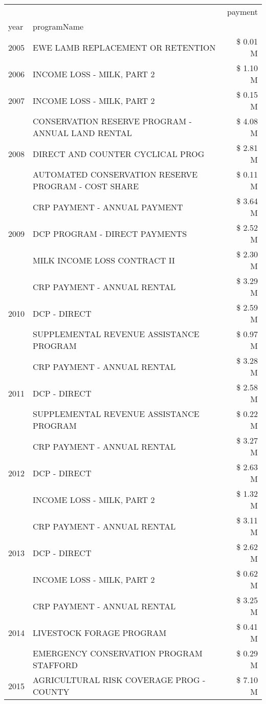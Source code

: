 \begin{tabular}{llr}
\toprule
 &  & payment \\
year & programName &  \\
\midrule
2005 & EWE LAMB REPLACEMENT OR RETENTION & \$ 0.01 M \\
\cline{1-3}
2006 & INCOME LOSS - MILK, PART 2 & \$ 1.10 M \\
\cline{1-3}
2007 & INCOME LOSS - MILK, PART 2 & \$ 0.15 M \\
\cline{1-3}
\multirow[t]{3}{*}{2008} & CONSERVATION RESERVE PROGRAM - ANNUAL LAND RENTAL & \$ 4.08 M \\
 & DIRECT AND COUNTER CYCLICAL PROG & \$ 2.81 M \\
 & AUTOMATED CONSERVATION RESERVE PROGRAM - COST SHARE & \$ 0.11 M \\
\cline{1-3}
\multirow[t]{3}{*}{2009} & CRP PAYMENT - ANNUAL PAYMENT & \$ 3.64 M \\
 & DCP PROGRAM - DIRECT PAYMENTS & \$ 2.52 M \\
 & MILK INCOME LOSS CONTRACT II & \$ 2.30 M \\
\cline{1-3}
\multirow[t]{3}{*}{2010} & CRP PAYMENT - ANNUAL RENTAL & \$ 3.29 M \\
 & DCP - DIRECT & \$ 2.59 M \\
 & SUPPLEMENTAL REVENUE ASSISTANCE PROGRAM & \$ 0.97 M \\
\cline{1-3}
\multirow[t]{3}{*}{2011} & CRP PAYMENT - ANNUAL RENTAL & \$ 3.28 M \\
 & DCP - DIRECT & \$ 2.58 M \\
 & SUPPLEMENTAL REVENUE ASSISTANCE PROGRAM & \$ 0.22 M \\
\cline{1-3}
\multirow[t]{3}{*}{2012} & CRP PAYMENT - ANNUAL RENTAL & \$ 3.27 M \\
 & DCP - DIRECT & \$ 2.63 M \\
 & INCOME LOSS - MILK, PART 2 & \$ 1.32 M \\
\cline{1-3}
\multirow[t]{3}{*}{2013} & CRP PAYMENT - ANNUAL RENTAL & \$ 3.11 M \\
 & DCP - DIRECT & \$ 2.62 M \\
 & INCOME LOSS - MILK, PART 2 & \$ 0.62 M \\
\cline{1-3}
\multirow[t]{3}{*}{2014} & CRP PAYMENT - ANNUAL RENTAL & \$ 3.25 M \\
 & LIVESTOCK FORAGE PROGRAM & \$ 0.41 M \\
 & EMERGENCY CONSERVATION PROGRAM STAFFORD & \$ 0.29 M \\
\cline{1-3}
\multirow[t]{3}{*}{2015} & AGRICULTURAL RISK COVERAGE PROG - COUNTY & \$ 7.10 M \\

\end{tabular}
